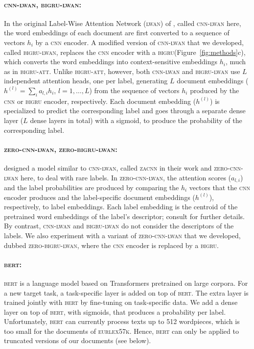 \documentclass[11pt,a4paper]{article}
\newcommand{\bigruatt}{\textsc{bigru-att}\xspace}
\newcommand{\bigru}{\textsc{bigru}\xspace}
\newcommand{\cnn}{\textsc{cnn}\xspace}
\newcommand{\zacnn}{\textsc{zacnn}\xspace}
\newcommand{\lwan}{\textsc{lwan}\xspace}
\newcommand{\lwancnn}{\textsc{cnn-lwan}\xspace}
\newcommand{\zlwancnn}{\textsc{zero-cnn-lwan}\xspace}
\newcommand{\lwangru}{\textsc{bigru-lwan}\xspace}
\newcommand{\zlwangru}{\textsc{zero-bigru-lwan}\xspace}
\newcommand{\bert}{\textsc{bert}\xspace}
\newcommand{\newdata}{\textsc{eurlex57k}\xspace}
\begin{document}
\paragraph{\lwancnn, \lwangru:}

In the original Label-Wise Attention Network (\lwan) of \citet{Mullenbach2018}, called \lwancnn here, the word embeddings of each document are first converted to a sequence of vectors $h_i$ by a \cnn encoder.  A modified version of \lwancnn that we developed, called \lwangru, replaces the \cnn encoder with a \bigru (Figure~\ref{fig:methods}c), which converts the word embeddings into context-sensitive embeddings $h_i$, much as in \bigruatt. Unlike \bigruatt, however, both \lwancnn and \lwangru use $L$ independent attention heads, one per label, generating $L$ document embeddings ($h^{(l)} = \sum_i a_{l,i} h_i$, $l=1, \dots, L$) from the sequence of vectors $h_i$ produced by the \cnn or \bigru encoder, respectively. Each document embedding ($h^{(l)}$) is specialized to predict the corresponding label and goes through a separate dense layer ($L$ dense layers in total) with a sigmoid, to produce the probability of the corresponding label.

\paragraph{\zlwancnn, \zlwangru:}
\citet{Rios2018-2} designed a model similar to \lwancnn, called \zacnn in their work and \zlwancnn here, to deal with rare labels. In \zlwancnn, the attention scores ($a_{l,i}$) and the label probabilities are produced by comparing the $h_i$ vectors that the \cnn encoder produces and the label-specific document embeddings ($h^{(l)}$), respectively, to label embeddings. Each label embedding is the centroid of the pretrained word embeddings of the label's descriptor; consult \citet{Rios2018-2} for further details. By contrast, \lwancnn and \lwangru do not consider the descriptors of the labels. We also experiment with a variant of \zlwancnn that we developed, dubbed \zlwangru, where the \cnn encoder is replaced by a \bigru.

\paragraph{\bert:} 
\bert \citep{bert} is a language model based on Transformers \citep{Vaswani2017} pretrained on large corpora. 
For a new target task, a task-specific layer is added on top of \textsc{bert}. The extra layer is trained jointly with \textsc{bert} by fine-tuning on task-specific data. We add a dense layer on top of \textsc{bert}, with sigmoids, that produces a probability per label. Unfortunately, \bert can currently process texts up to 512 wordpieces, which is too small for the documents of \newdata. Hence, \bert can only be applied to truncated versions of our documents (see below). 
\end{document}
